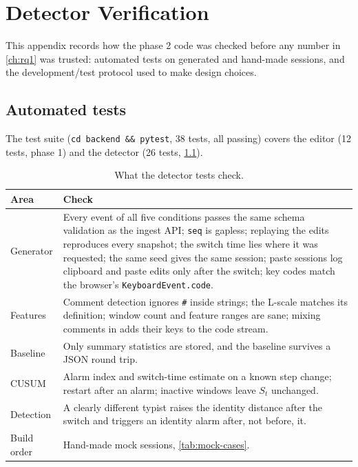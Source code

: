 \chapter{Detector Verification}
\label{app:verification}

This appendix records how the phase 2 code was checked before any number
in \cref{ch:rq1} was trusted: automated tests on generated and hand-made
sessions, and the development/test protocol used to make design choices.

\section{Automated tests}
The test suite (\texttt{cd backend \&\& pytest}, 38 tests, all passing)
covers the editor (12 tests, phase 1) and the detector (26 tests,
\cref{tab:tests}).

\begin{table}[ht]
  \centering\small
  \caption{What the detector tests check.}
  \label{tab:tests}
  \begin{tabularx}{\linewidth}{@{}lX@{}}
    \toprule
    Area & Check \\
    \midrule
    Generator & Every event of all five conditions passes the same schema
      validation as the ingest API; \texttt{seq} is gapless; replaying the
      edits reproduces every snapshot; the switch time lies where it was
      requested; the same seed gives the same session; paste sessions log
      clipboard and paste edits only after the switch; key codes match the
      browser's \texttt{KeyboardEvent.code}. \\
    Features & Comment detection ignores \texttt{\#} inside strings; the
      L-scale matches its definition; window count and feature ranges are
      sane; mixing comments in adds their keys to the code stream. \\
    Baseline & Only summary statistics are stored, and the baseline
      survives a JSON round trip. \\
    CUSUM & Alarm index and switch-time estimate on a known step change;
      restart after an alarm; inactive windows leave $S_t$ unchanged. \\
    Detection & A clearly different typist raises the identity distance
      after the switch and triggers an identity alarm after, not before, it. \\
    Build order & Hand-made mock sessions, \cref{tab:mock-cases}. \\
    \bottomrule
  \end{tabularx}
\end{table}


